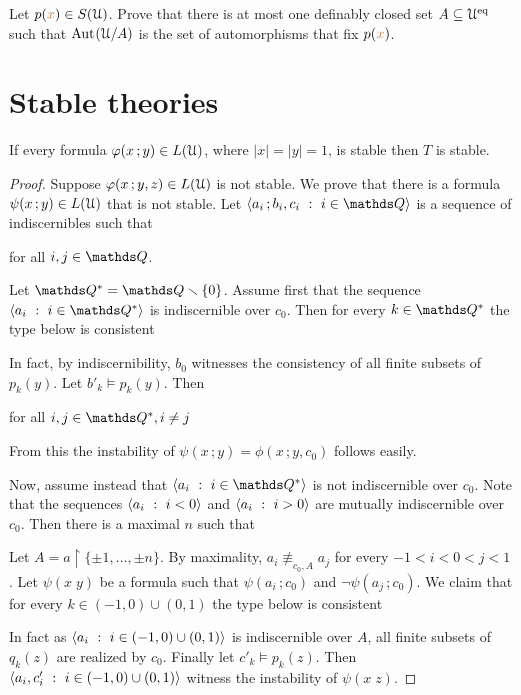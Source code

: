 \documentclass[creche.tex]{subfiles}
\begin{document}
\begin{exercise}\label{ex_Cb}
  Let $p({\color{brown} x})\in S(\EuScript U)$. Prove that there is at most one definably closed set $A\subseteq\EuScript U^{{\rm eq}}$ such that ${\rm Aut\kern.15ex}(\EuScript U/A)$ is the set of automorphisms that fix $p({\color{brown} x})$.\QED
  \end{exercise}
  
  

\section{Stable theories}
\label{stable_theories}

\begin{theorem}
  If every formula $\varphi(x\,;y)\in L(\EuScript U)$, where $|x|=|y|=1$, is stable then $T$ is stable.
\end{theorem} 

\begin{proof}
  Suppose $\varphi(x\,;y,z)\in L(\EuScript U)$ is not stable.
  We prove that there is a formula $\psi(x\,;y)\in L(\EuScript U)$ that is not stable.
  Let $\<a_i\,;b_i,c_i\ :\ i\in\QQ\>$ is a sequence of indiscernibles such that 

  \hfill for all $i,j\in\QQ$.

  Let $\QQ^*=\QQ\sm\{0\}$.
  Assume first that the sequence $\<a_i\ :\ i\in\QQ^*\>$ is indiscernible over $c_0$.
  Then for every $k\in\QQ^*$ the type below is consistent


  In fact, by indiscernibility, $b_0$ witnesses the consistency of all finite subsets of $p_k(y)$.
  Let $b'_k\models p_k(y)$.
  Then

  \hfill for all $i,j\in\QQ^*, i\neq j$

  From this the instability of $\psi(x\,;y)=\phi(x\,;y,c_0)$ follows easily.

  Now, assume instead that $\<a_i\ :\ i\in\QQ^*\>$ is not indiscernible over $c_0$.
  Note that the sequences $\<a_i\ :\ i<0\>$ and $\<a_i\ :\ i>0\>$ are mutually indiscernible over $c_0$.
  Then there is a maximal $n$ such that


  Let $A=a\restriction\{\pm1,\dots,\pm n\}$.
  By maximality, $a_i\nequiv_{c_0,A}a_j$ for every $-1<i<0<j<1$.
  Let $\psi(x\;y)$ be a formula such that $\psi(a_i\,;c_0)$ and $\neg\psi(a_j\,;c_0)$.
  We claim that for every $k\in(-1,0)\cup(0,1)$ the type below is consistent


  In fact as $\<a_i\ :\ i\in(-1,0)\cup(0,1)\>$ is indiscernible over $A$, all finite subsets of $q_k(z)$ are realized by $c_0$.
  Finally let $c'_k\models p_k(z)$.
  Then $\<a_i,c'_i\ :\ i\in(-1,0)\cup(0,1)\>$ witness the instability of $\psi(x\;z)$.
\end{proof}
\end{document}
